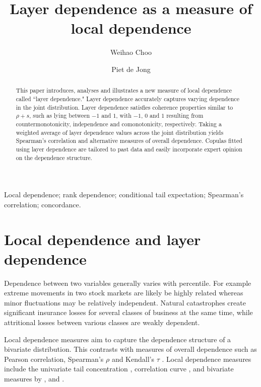 \documentclass[authoryear]{elsarticle}
\begin{document}
\begin{frontmatter}

\title{Layer dependence as a measure of local dependence}
\author[acst]{Weihao Choo}
\author[acst]{Piet de Jong}



\address[acst]{Department of Actuarial Studies Macquarie
University, NSW 2109, Australia.}




\begin{abstract}
This paper introduces, analyses and  illustrates a new measure of local dependence called  ``layer dependence." Layer dependence accurately captures varying dependence in the joint distribution. Layer dependence satisfies coherence properties similar to $\rho+s$, such as lying between $-1$ and $1$, with $-1$, $0$ and $1$ resulting from countermonotonicity, independence and comonotonicity, respectively. Taking a weighted average of layer dependence values across the joint distribution yields Spearman's correlation and alternative measures of overall dependence. Copulas fitted using layer dependence are tailored to past data and easily incorporate expert opinion on the dependence structure.
\end{abstract}

\begin{keyword}
Local dependence; rank dependence; conditional tail expectation; Spearman's correlation; concordance.
\end{keyword}



\end{frontmatter}

\section{Local dependence and layer dependence}

Dependence between two variables generally varies  with percentile. For example extreme movements in two stock markets are likely be highly related  whereas minor fluctuations may be relatively independent. Natural catastrophes create significant insurance losses for several classes of business at the same time, while attritional losses between various classes are weakly dependent.

Local dependence measures aim to capture the dependence structure of a bivariate distribution. This contrasts with  measures of overall dependence such as Pearson correlation, Spearman's $\rho$ and Kendall's $\tau$ \citep{embrechts2002correlation}. Local dependence measures include the univariate tail concentration \citep{venter2002tails}, correlation curve \citep{bjerve1993correlation}, and bivariate measures by \cite{bairamov2003new}, \cite{jones1996local} and \cite{holland1987dependence}.
\end{document}
